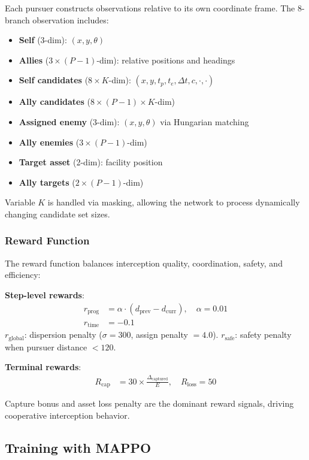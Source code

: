 \documentclass[10pt,conference]{IEEEtran}
\begin{document}
Each pursuer constructs observations relative to its own coordinate frame. The 8-branch observation includes:
\begin{itemize}
    \item \textbf{Self} (3-dim): $(x, y, \theta)$
    \item \textbf{Allies} ($3 \times (P-1)$-dim): relative positions and headings
    \item \textbf{Self candidates} ($8 \times K$-dim): $(x, y, t_p, t_e, \Delta t, c, \cdot, \cdot)$
    \item \textbf{Ally candidates} ($8 \times (P-1) \times K$-dim)
    \item \textbf{Assigned enemy} (3-dim): $(x, y, \theta)$ via Hungarian matching
    \item \textbf{Ally enemies} ($3 \times (P-1)$-dim)
    \item \textbf{Target asset} (2-dim): facility position
    \item \textbf{Ally targets} ($2 \times (P-1)$-dim)
\end{itemize}

Variable $K$ is handled via masking, allowing the network to process dynamically changing candidate set sizes.

\subsubsection{Reward Function}

The reward function balances interception quality, coordination, safety, and efficiency:

\textbf{Step-level rewards}:
\begin{align}
    r_{\text{prog}} &= \alpha \cdot (d_{\text{prev}} - d_{\text{curr}}), \quad \alpha = 0.01 \\
    r_{\text{time}} &= -0.1
\end{align}
$r_{\text{global}}$: dispersion penalty ($\sigma = 300$, assign penalty $= 4.0$). $r_{\text{safe}}$: safety penalty when pursuer distance $< 120$.

\textbf{Terminal rewards}:
\begin{align}
    R_{\text{cap}} &= 30 \times \frac{\Delta_{\text{captured}}}{E}, \quad R_{\text{loss}} = 50
\end{align}

Capture bonus and asset loss penalty are the dominant reward signals, driving cooperative interception behavior.

\subsection{Training with MAPPO}
\end{document}
